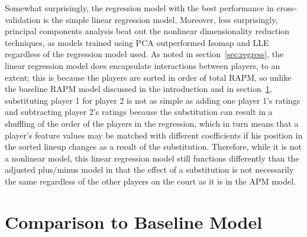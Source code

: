 Somewhat surprisingly, the regression model with the best performance in
cross-validation is the simple linear regression model. Moreover, less surprisingly,
principal components analysis beat out the nonlinear dimensionality reduction
techniques, as models trained using PCA outperformed Isomap and LLE regardless of
the regression model used. As noted in section~\ref{sec:regress}, the linear
regression model does encapsulate interactions between players, to an extent; this
is because the players are sorted in order of total RAPM, so unlike the baseline
RAPM model discussed in the introduction and in section~\ref{sec:baseline},
substituting player 1 for player 2 is not as simple as adding one player 1's ratings
and subtracting player 2's ratings because the substitution can result in a
shuffling of the order of the players in the regression, which in turn means that
a player's feature values may be matched with different coefficients if his position
in the sorted lineup changes as a result of the substitution. Therefore, while it is
not a nonlinear model, this linear regression model still functions differently than
the adjusted plus/minus model in that the effect of a substitution is not
necessarily the same regardless of the other players on the court as it is in the
APM model.

\section{Comparison to Baseline Model}
\label{sec:baseline}

